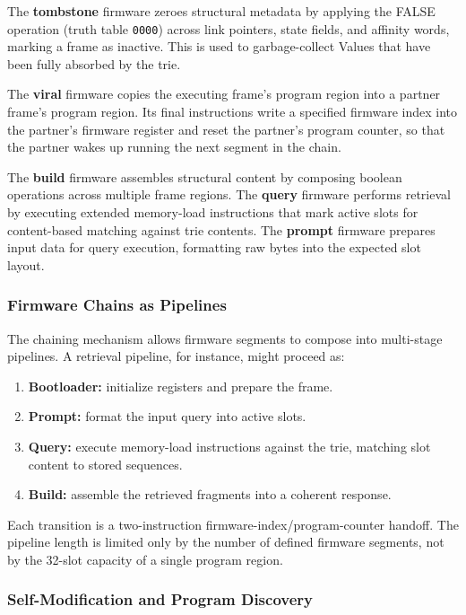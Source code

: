 The \textbf{tombstone} firmware zeroes structural metadata by applying
the FALSE operation (truth table \texttt{0000}) across link pointers,
state fields, and affinity words, marking a frame as inactive.  This is
used to garbage-collect Values that have been fully absorbed by the
trie.

The \textbf{viral} firmware copies the executing frame's program region
into a partner frame's program region.  Its final instructions write a
specified firmware index into the partner's firmware register and reset
the partner's program counter, so that the partner wakes up running the
next segment in the chain.

The \textbf{build} firmware assembles structural content by composing
boolean operations across multiple frame regions.  The \textbf{query}
firmware performs retrieval by executing extended memory-load
instructions that mark active slots for content-based matching against
trie contents.  The \textbf{prompt} firmware prepares input data for
query execution, formatting raw bytes into the expected slot layout.

\subsubsection{Firmware Chains as Pipelines}

The chaining mechanism allows firmware segments to compose into
multi-stage pipelines.  A retrieval pipeline, for instance, might
proceed as:

\begin{enumerate}[nosep]
  \item \textbf{Bootloader:} initialize registers and prepare the frame.
  \item \textbf{Prompt:} format the input query into active slots.
  \item \textbf{Query:} execute memory-load instructions against the
        trie, matching slot content to stored sequences.
  \item \textbf{Build:} assemble the retrieved fragments into a
        coherent response.
\end{enumerate}

Each transition is a two-instruction firmware-index/program-counter
handoff.  The pipeline length is limited only by the number of defined
firmware segments, not by the 32-slot capacity of a single program
region.

\subsubsection{Self-Modification and Program Discovery}

